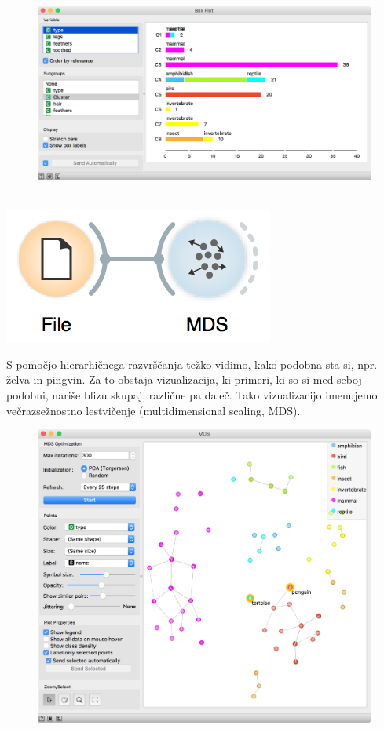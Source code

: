 \newpage

\begin{figure}[h]
    \includegraphics[width=\linewidth]{box-plot2.png}%
    \caption{$\;$}
\end{figure}

\begin{marginfigure}[1.5cm]
    \includegraphics[width=\linewidth]{workflow3.png}
    \caption{}
\end{marginfigure}

S pomočjo hierarhičnega razvrščanja težko vidimo, kako podobna sta si, npr. želva in pingvin. Za to obstaja vizualizacija, ki primeri, ki so si med seboj podobni, nariše blizu skupaj, različne pa daleč. Tako vizualizacijo imenujemo večrazsežnostno lestvičenje (multidimensional scaling, MDS).

\begin{figure}[h]
    \includegraphics[width=0.7\linewidth]{mds.png}%
    \caption{$\;$}
\end{figure}